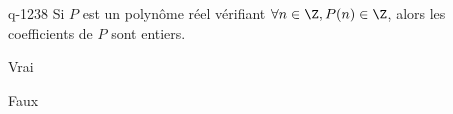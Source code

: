 \begin{truefalse}{q-1238}
Si $P$ est un polynôme réel vérifiant $\forall n \in \Z, P(n) \in \Z$, alors les coefficients de $P$ sont entiers.
\item Vrai
\item* Faux
\end{truefalse}

